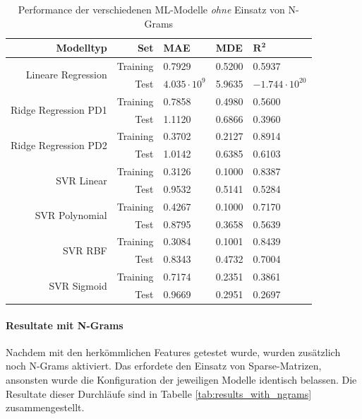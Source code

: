 \documentclass[10pt, a4paper]{article}
\begin{document}
\begin{table}[ht]
	\begin{tabular}[c]{|r|r|l|l|l|}
		\hline
		\textbf{Modelltyp} & \textbf{Set} & \textbf{MAE} & \textbf{MDE}	& \(\mathbf{R^2}\) \\ \hline
		\multirow{2}{*}{Lineare Regression}
		& Training 	& 0.7929 & 0.5200 & 0.5937 \\ \cline{2-5}
		& Test 		& \(4.035 \cdot 10^9\) & 5.9635 & \(-1.744 \cdot 10^{20}\) \\ \hline
		\multirow{2}{*}{Ridge Regression PD1}
		& Training 	& 0.7858 & 0.4980 & 0.5600 \\ \cline{2-5}
		& Test 		& 1.1120 & 0.6866 & 0.3960 \\ \hline
		\multirow{2}{*}{Ridge Regression PD2}
		& Training 	& 0.3702 & 0.2127 & 0.8914 \\ \cline{2-5}
		& Test 		& 1.0142 & 0.6385 & 0.6103 \\ \hline
		\multirow{2}{*}{SVR Linear}
		& Training 	& 0.3126 & 0.1000 & 0.8387 \\ \cline{2-5}
		& Test 		& 0.9532 & 0.5141 & 0.5284 \\ \hline
		\multirow{2}{*}{SVR Polynomial}
		& Training 	& 0.4267 & 0.1000 & 0.7170 \\ \cline{2-5}
		& Test 		& 0.8795 & 0.3658 & 0.5639 \\ \hline
		\multirow{2}{*}{SVR RBF}
		& Training 	& 0.3084 & 0.1001 & 0.8439 \\ \cline{2-5}
		& Test 		& 0.8343 & 0.4732 & 0.7004 \\ \hline
		\multirow{2}{*}{SVR Sigmoid}
		& Training 	& 0.7174 & 0.2351 & 0.3861 \\ \cline{2-5}
		& Test 		& 0.9669 & 0.2951 & 0.2697 \\ \hline
	\end{tabular}
	\centering
	\caption{Performance der verschiedenen \ac{ML}-Modelle \emph{ohne} Einsatz von N-Grams}
	\label{tab:results_without_ngrams}
\end{table}

\paragraph{Resultate mit N-Grams} 
Nachdem mit den herkömmlichen Features getestet wurde, wurden zusätzlich noch N-Grams aktiviert. Das erfordete den Einsatz von Sparse-Matrizen, ansonsten wurde die Konfiguration der jeweiligen Modelle identisch belassen. Die Resultate dieser Durchläufe sind in Tabelle \ref{tab:results_with_ngrams} zusammengestellt.
\end{document}
